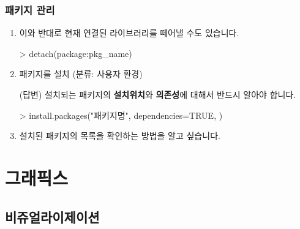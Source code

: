 \documentclass{book}
\begin{document}
%
%
%

\section{패키지 관리}
\begin{enumerate}
\item 	이와 반대로 현재 연결된 라이브러리를 떼어낼 수도 있습니다. 

	\begin{Schunk}
	\begin{Soutput}
	> detach(package:pkg_name)	
	\end{Soutput}
	\end{Schunk}


	\item 패키지를 설치 (분류: 사용자 환경)  
	
	\textsf{(답변)} 설치되는 패키지의 \textbf{설치위치}와 \textbf{의존성}에 대해서 반드시 알아야 합니다. 
	
	\begin{Schunk}
	\begin{Soutput}
	> install.packages("패키지명", dependencies=TRUE, )
	\end{Soutput}
	\end{Schunk}

	\item 설치된 패키지의 목록을 확인하는 방법을 알고 싶습니다.
\end{enumerate}


%
%

\part{그래픽스}
\chapter{비쥬얼라이제이션}
\end{document}
